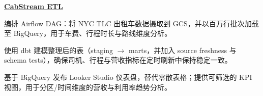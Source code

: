 \begin{twocolentry}{}
\href{https://github.com/faketut/CabStream-ETL}{\textbf{CabStream ETL}}
\end{twocolentry}
\begin{onecolentry}
\begin{highlights}
\item 编排 Airflow DAG：将 NYC TLC 出租车数据摄取到 GCS，并以百万行批次加载至 BigQuery，用于车费、行程时长与路线维度分析。
\item 使用 dbt 建模整理后的表（staging $\rightarrow$ marts，并加入 source freshness 与 schema tests），确保司机、行程与营收指标在定时刷新中保持稳定一致。
\item 基于 BigQuery 发布 Looker Studio 仪表盘，替代零散表格；提供可筛选的 KPI 视图，用于分区/时间维度的营收与利用率趋势分析。
\end{highlights}
\end{onecolentry}

